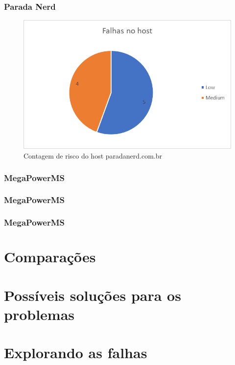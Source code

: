 \documentclass[
	12pt,				%
	openright,			%
	twoside,			%
	a4paper,			%
	english,			%
	french,				%
	spanish,			%
	brazil				%
	]{abntex2}
\begin{document}
\subsection{Parada Nerd}
\begin{figure}[h]
	\centering
	\includegraphics[width=0.7\linewidth]{Imagens/ParadaNerd}
	\caption[Parada Nerd]{Contagem de risco do host paradanerd.com.br}
	\label{fig:paradanerd}
\end{figure}

\subsection{MegaPowerMS}

\subsection{MegaPowerMS}

\subsection{MegaPowerMS}


\chapter{Comparações}

\chapter{Possíveis soluções para os problemas}

\chapter{Explorando as falhas}

\end{document}
